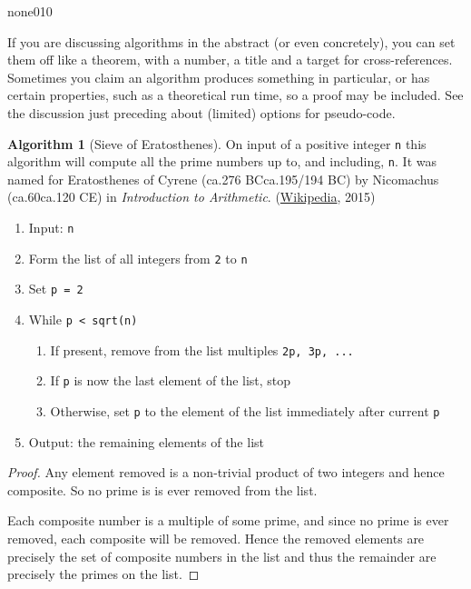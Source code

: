 \documentclass{amsart}
\theoremstyle{plain}%
\theoremstyle{definition}%
\newtheorem{algorithm}[theorem]{Algorithm}
\theoremstyle{remark}%
\newcommand{\mono}[1]{\texttt{#1}}
\newcommand{\pubtitle}[1]{\textsl{#1}}
\numberwithin{equation}{section}
\begin{document}
\begin{program}{none}{0}{1}{0}

\end{program}
If you are discussing algorithms in the abstract (or even concretely), you can set them off like a theorem, with a number, a title and a target for cross-references.  Sometimes you claim an algorithm produces something in particular, or has certain properties, such as a theoretical run time, so a proof may be included.  See the discussion just preceding about (limited) options for pseudo-code.%
\begin{algorithm}[Sieve of Eratosthenes]\label{algorithm-sieve-eratosthenes}%
%
On input of a positive integer \mono{n} this algorithm will compute all the prime numbers up to, and including, \mono{n}.  It was named for Eratosthenes of Cyrene (ca.\@ 276 BC\textendash{}ca.\@ 195\slash{}194 BC) by Nicomachus (ca.\@ 60\textendash{}ca.\@ 120 CE) in \pubtitle{Introduction to Arithmetic}. (\href{http://en.wikipedia.org/wiki/Sieve_of_Eratosthenes}{Wikipedia}\footnotemark{}, 2015)%
\begin{enumerate}
\item{}Input: \mono{n}%
\item{}Form the list of all integers from \mono{2} to \mono{n}%
\item{}Set \mono{p = 2}%
\item{}While \mono{p < sqrt(n)}%
\begin{enumerate}[label={\arabic*.}]
\item{}If present, remove from the list multiples \mono{2p, 3p, ...}%
\item{}If \mono{p} is now the last element of the list, stop%
\item{}Otherwise, set \mono{p} to the element of the list immediately after current \mono{p}%
\end{enumerate}
%
\item{}Output: the remaining elements of the list%
\end{enumerate}
%
\end{algorithm}
\begin{proof}\label{algorithm-sieve-eratosthenes-3}%
Any element removed is a non-trivial product of two integers and hence composite.  So no prime is is ever removed from the list.%
\par
Each composite number is a multiple of some prime, and since no prime is ever removed, each composite will be removed.  Hence the removed elements are precisely the set of composite numbers in the list and thus the remainder are precisely the primes on the list.%
\end{proof}
\end{document}
